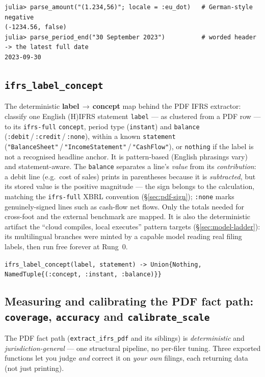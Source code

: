 \documentclass[11pt,a4paper]{report}
\newcommand{\sig}[1]{\medskip\noindent\texttt{#1}\par\medskip}
\begin{document}
\begin{lstlisting}
julia> parse_amount("(1.234,56)"; locale = :eu_dot)   # German-style negative
(-1234.56, false)
julia> parse_period_end("30 September 2023")          # worded header -> the latest full date
2023-09-30
\end{lstlisting}

\subsection{\texttt{ifrs\_label\_concept}}
\label{sec:api-ifrs-label-concept}

\noindent The deterministic \textbf{label\,$\to$\,concept} map behind the PDF IFRS extractor: classify one
English (H)IFRS statement \texttt{label} --- as clustered from a PDF row --- to its \texttt{ifrs-full}
\texttt{concept}, period type (\texttt{instant}) and \texttt{balance}
(\texttt{:debit}\,/\,\texttt{:credit}\,/\,\texttt{:none}), within a known \texttt{statement}
(\texttt{"BalanceSheet"}\,/\,\texttt{"IncomeStatement"}\,/\,\texttt{"CashFlow"}), or \texttt{nothing} if the
label is not a recognised headline anchor. It is pattern-based (English phrasings vary) and statement-aware. The
\texttt{balance} separates a line's \emph{value} from its \emph{contribution}: a debit line (e.g.\ cost of
sales) prints in parentheses because it is \emph{subtracted}, but its stored value is the positive magnitude ---
the sign belongs to the calculation, matching the \texttt{ifrs-full} XBRL convention (\S\ref{sec:pdf-sign});
\texttt{:none} marks genuinely-signed lines such as cash-flow net flows. Only the totals needed for cross-foot
and the external benchmark are mapped. It is also the deterministic artifact the ``cloud compiles, local
executes'' pattern targets (\S\ref{sec:model-ladder}): its multilingual branches were minted by a capable model
reading real filing labels, then run free forever at Rung~0.

\sig{ifrs\_label\_concept(label, statement) -> Union\{Nothing, NamedTuple\{(:concept, :instant, :balance)\}\}}

\subsection{Measuring and calibrating the PDF fact path: \texttt{coverage}, \texttt{accuracy} and
\texttt{calibrate\_scale}}
\label{sec:pdf-accuracy}

The PDF fact path (\texttt{extract\_ifrs\_pdf} and its siblings) is \emph{deterministic} and
\emph{jurisdiction-general} --- one structural pipeline, no per-filer tuning. Three exported functions let you
judge \emph{and} correct it on \emph{your own} filings, each returning data (not just printing).
\end{document}
